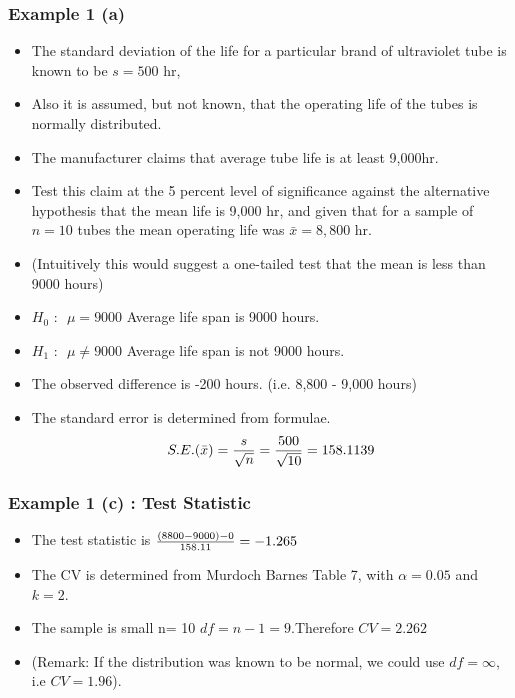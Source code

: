 \documentclass[a4paper,12pt]{article}
\begin{document}
\begin{frame}
\frametitle{Example 1 (a)}
\large
\begin{itemize}
\item The standard deviation of the life for a particular brand of ultraviolet tube is known to be $s = 500$ hr,
\item Also it is assumed, but not known, that the operating life of the tubes is normally distributed. \item The manufacturer claims that average tube life
is at least 9,000hr. \item Test this claim at the 5 percent level of significance against the alternative hypothesis
that the mean life is 9,000 hr, and given that for a sample of $n = 10$ tubes the mean operating
life was $\bar{x} = 8,800$ hr.
\item (Intuitively this would suggest a one-tailed test that the mean is less than 9000 hours)
\end{itemize}

\large
\begin{itemize}
\item $H_0 \mbox{ : } $ $\mu = 9000$ Average life span is 9000 hours.
\item $H_1 \mbox{ : } $ $\mu \neq 9000$ Average life span is not 9000 hours.
\end{itemize}
\bigskip
\begin{itemize}
\item The observed difference is -200 hours. (i.e. 8,800 - 9,000 hours)
\item The standard error is determined from formulae.
\[ S.E.(\bar{x}) = {s \over \sqrt{n}} = {500 \over \sqrt{10}}  = 158.1139 \]
\end{itemize}

\frametitle{Example 1 (c) : Test Statistic }
\large
\begin{itemize}
\item The test statistic is ${(8800-9000) -0 \over  158.11} = -1.265$
\item The CV is determined from Murdoch Barnes Table 7, with $\alpha = 0.05$ and $k = 2$.
\item The sample is small n= 10 $df = n-1 = 9$.Therefore $CV = 2.262$
\item (Remark: If the distribution was known to be normal, we could use $df = \infty$, i.e $CV = 1.96$).
\end{itemize}


\end{frame}
\end{document}
